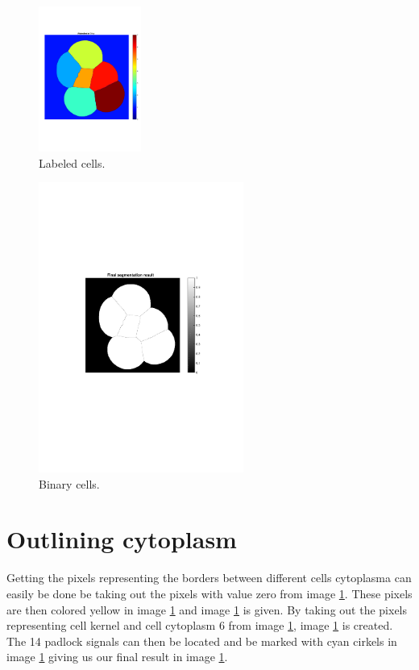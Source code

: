 \documentclass[10pt,twocolumn]{article}
\begin{document}
\begin{figure}[ht]
\centering
\includegraphics[width=0.3\textwidth]{Bilder/CellBwLabeld.pdf}
\caption{Labeled cells.}
\label{fig:CellLabeled}
\end{figure}

\begin{figure}[ht]
\centering
\includegraphics[width=0.6\textwidth]{Bilder/CellBw.pdf}
\caption{Binary cells.}
\label{fig:CellBw}
\end{figure}

\section{Outlining cytoplasm}
Getting the pixels representing the borders between different cells cytoplasma can
easily be done be taking out the pixels with value zero from image \ref{}.
These pixels are then colored yellow in image \ref{} and image \ref{} is given.
By taking out the pixels representing cell kernel and cell cytoplasm 6 from image
\ref{}, image \ref{} is created. The 14 padlock signals can then be located and
be marked with cyan cirkels in image \ref{} giving us our final result in image \ref{}.
\end{document}
